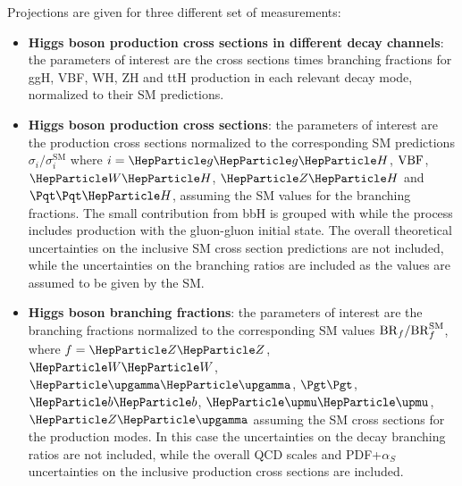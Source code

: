 
Projections are given for three different set of measurements:
\begin{itemize}
    \item \textbf{Higgs boson production cross sections in different decay channels}: the parameters of interest are the cross sections times branching fractions for ggH, VBF, WH, ZH and ttH production in each relevant decay mode, normalized to their SM predictions.
    \item \textbf{Higgs boson production cross sections}:  the parameters of interest are the production cross sections normalized to the corresponding SM predictions  $\sigma_{i}/\sigma_{i}^{\mathrm{SM}}$  where $i=\ggh$, $\mathrm{VBF}$, $\wh$, $\zh$ and $\tth$, assuming the SM values for the branching fractions. The small contribution from bbH is grouped with \ggh while the \zh process includes \zh production with the gluon-gluon initial state. The overall theoretical uncertainties on the inclusive SM cross section predictions are not included, while the uncertainties on the branching ratios are included as the values are assumed to be given by the SM.
    \item \textbf{Higgs boson branching fractions}: the parameters of interest are the branching fractions normalized to the corresponding SM values ${\rm BR}_{f}/{\rm BR}_{f}^{\mathrm{SM}}$, where $f = \zz$, $\ww$, $\PGg\PGg$, $\tautau$, $\bb$, $\mumu$, $\PZ\PGg$ assuming the SM cross sections for the production modes. In this case  the uncertainties on the decay branching ratios are not included, while the overall QCD scales and PDF+$\alpha_{S}$ uncertainties on the inclusive production cross sections are included.

\end{itemize}

